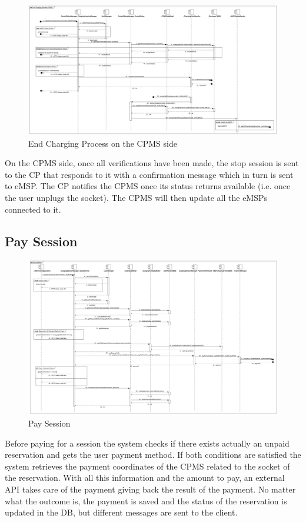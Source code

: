 \documentclass{Configuration_Files/PoliMi3i_thesis}
\begin{document}
\begin{figure}[H]
    \centering
    \includegraphics[width=1\textwidth]{Images/sequenceDiagrams/End Charging Process CPMS.jpg}
    \caption{End Charging Process on the CPMS side}
\end{figure}
On the CPMS side, once all verifications have been made, the stop session is sent to the CP that responds to it with a confirmation message which in turn is sent to eMSP.
The CP notifies the CPMS once its status returns available (i.e. once the user unplugs the socket). The CPMS will then update all the eMSPs connected to it.

\subsection{Pay Session}
\begin{figure}[H]
    \centering
    \includegraphics[width=1\textwidth]{Images/sequenceDiagrams/Pay Session.jpg}
    \caption{Pay Session}
\end{figure}
Before paying for a session the system checks if there exists actually an unpaid reservation and gets the user payment method. If both conditions are satisfied the system retrieves the payment coordinates of the CPMS related to the socket of the reservation. With all this information and the amount to pay, an external API takes care of the payment giving back the result of the payment. No matter what the outcome is, the payment is saved and the status of the reservation is updated in the DB, but different messages are sent to the client.
\end{document}

